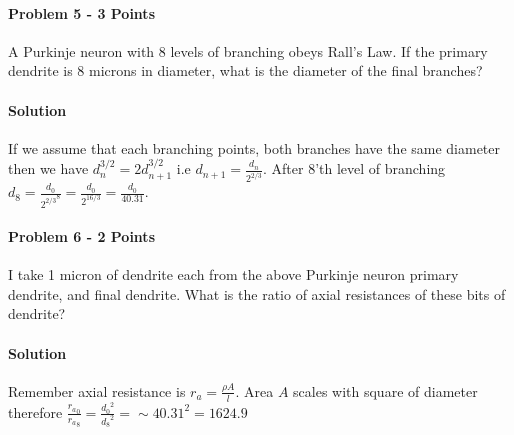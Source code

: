 \documentclass[a4paper,10pt]{article}
\begin{document}
\paragraph{Problem 5 - 3 Points}
A Purkinje neuron with 8 levels of branching obeys Rall’s Law. If the primary
dendrite is 8 microns in diameter, what is the diameter of the final branches?

\paragraph{Solution} If we assume that each branching points, both branches have
the same diameter then we have $d_n^{3/2} = 2 d_{n+1}^{3/2}$ i.e 
$d_{n+1} = \frac{d_n}{2^{2/3}}$. After 8'th level of branching 
$d_8 = \frac{d_0}{{2^{2/3}}^8} = \frac{d_0}{2^{16/3}} = \frac{d_0}{40.31}$.


\paragraph{Problem 6 - 2 Points}
I take 1 micron of dendrite each from the above Purkinje neuron primary
dendrite, and final dendrite. What is the ratio of axial resistances of these
bits of dendrite?

\paragraph{Solution} Remember axial resistance is $r_a = \frac{\rho A}{l}$.
Area $A$ scales with square of diameter therefore 
$\frac{{r_a}_0}{{r_a}_8} = \frac{{d_0}^2}{{d_8}^2} = \sim 40.31 ^ 2 = 1624.9$
\end{document}
